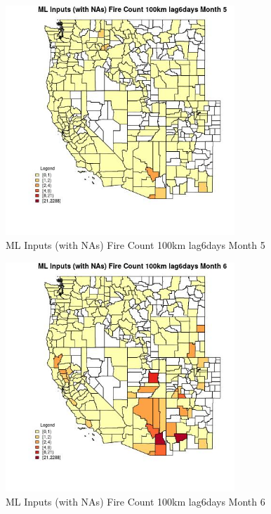 \begin{figure} 
\centering  
\includegraphics[width=0.77\textwidth]{Code_Outputs/Report_ML_input_PM25_Step4_part_e_de_duplicated_aves_compiled_2019-05-21wNAs_CountyFire_Count_100km_lag6daysmedianMonth5.jpg} 
\caption{\label{fig:Report_ML_input_PM25_Step4_part_e_de_duplicated_aves_compiled_2019-05-21wNAsCountyFire_Count_100km_lag6daysmedianMonth5}ML Inputs (with NAs) Fire Count 100km lag6days Month 5} 
\end{figure} 
 

\begin{figure} 
\centering  
\includegraphics[width=0.77\textwidth]{Code_Outputs/Report_ML_input_PM25_Step4_part_e_de_duplicated_aves_compiled_2019-05-21wNAs_CountyFire_Count_100km_lag6daysmedianMonth6.jpg} 
\caption{\label{fig:Report_ML_input_PM25_Step4_part_e_de_duplicated_aves_compiled_2019-05-21wNAsCountyFire_Count_100km_lag6daysmedianMonth6}ML Inputs (with NAs) Fire Count 100km lag6days Month 6} 
\end{figure} 
 

